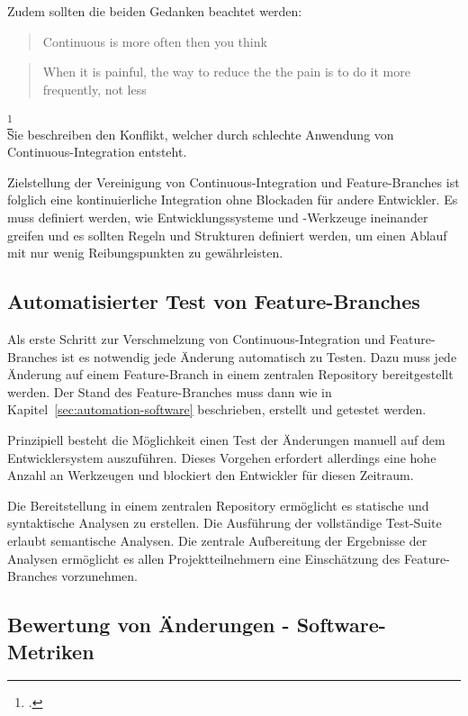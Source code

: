 Zudem sollten die beiden Gedanken beachtet werden:\\

\blockquote {Continuous is more often then you think} 
 
\blockquote {When it is painful, the way to reduce the the pain is to do it more frequently, not less}\footcite[S.24][]{humble2010} \\

Sie beschreiben den Konflikt, welcher durch schlechte Anwendung von Continuous-Integration entsteht. 

Zielstellung der Vereinigung von Continuous-Integration und Feature-Branches ist folglich eine kontinuierliche Integration ohne Blockaden für andere Entwickler. Es muss definiert werden, wie Entwicklungssysteme und -Werkzeuge ineinander greifen und es sollten Regeln und Strukturen definiert werden, um einen Ablauf mit nur wenig Reibungspunkten zu gewährleisten.

\subsection{Automatisierter Test von Feature-Branches}

Als erste Schritt zur Verschmelzung von Continuous-Integration und Feature-Branches ist es notwendig jede Änderung automatisch zu Testen. Dazu muss jede Änderung auf einem Feature-Branch in einem zentralen Repository bereitgestellt werden. Der Stand des Feature-Branches muss dann wie in Kapitel~\ref{sec:automation-software}  beschrieben, erstellt und getestet werden.

Prinzipiell besteht die Möglichkeit einen Test der Änderungen manuell auf dem Entwicklersystem auszuführen. Dieses Vorgehen erfordert allerdings eine hohe Anzahl an Werkzeugen und blockiert den Entwickler für diesen Zeitraum.

Die Bereitstellung in einem zentralen Repository ermöglicht es statische und syntaktische Analysen zu erstellen. Die Ausführung der vollständige Test-Suite erlaubt semantische Analysen. Die zentrale Aufbereitung der Ergebnisse der Analysen ermöglicht es allen Projektteilnehmern eine Einschätzung des Feature-Branches vorzunehmen.

\subsection{Bewertung von Änderungen - Software-Metriken}
\label{subsec:main-metrics}

